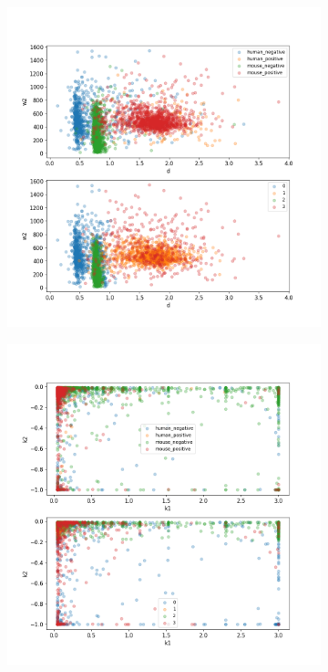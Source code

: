 \begin{figure}
\begin{subfigure}{0.45\textwidth}
	\end{subfigure}
	\hfill
	\begin{subfigure}{0.45\textwidth}
		\includegraphics[width=\textwidth]{fig/seperate_d_w2}
	\end{subfigure}
	\hfill
	\begin{subfigure}{0.45\textwidth}
		\includegraphics[width=\textwidth]{fig/seperate_k1_k2}

\end{subfigure}
\end{figure}
